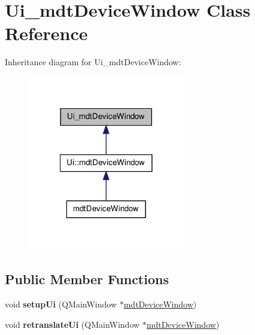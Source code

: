 \hypertarget{class_ui__mdt_device_window}{
\section{Ui\_\-mdtDeviceWindow Class Reference}
\label{class_ui__mdt_device_window}
}


Inheritance diagram for Ui\_\-mdtDeviceWindow:
\nopagebreak
\begin{figure}[H]
\begin{center}
\leavevmode
\includegraphics[width=194pt]{class_ui__mdt_device_window__inherit__graph}
\end{center}
\end{figure}
\subsection*{Public Member Functions}
\begin{DoxyCompactItemize}
\item 
\hypertarget{class_ui__mdt_device_window_a0cdedb1dd83eba2873d0c17c529a30ca}{
void {\bfseries setupUi} (QMainWindow $\ast$\hyperlink{classmdt_device_window}{mdtDeviceWindow})}
\label{class_ui__mdt_device_window_a0cdedb1dd83eba2873d0c17c529a30ca}

\item 
\hypertarget{class_ui__mdt_device_window_af16eccf51af471614d5798135a342119}{
void {\bfseries retranslateUi} (QMainWindow $\ast$\hyperlink{classmdt_device_window}{mdtDeviceWindow})}
\label{class_ui__mdt_device_window_af16eccf51af471614d5798135a342119}

\end{DoxyCompactItemize}
